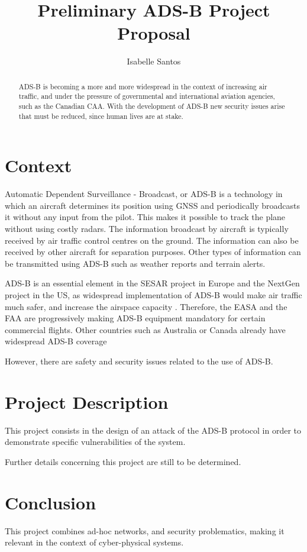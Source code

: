 \documentclass[10pt,letterpaper]{article}
\author{Isabelle Santos}
\title{Preliminary ADS-B Project Proposal}
\begin{document}
\maketitle
\begin{abstract}
ADS-B is becoming a more and more widespread in the context of increasing air traffic, and under the pressure of governmental and international aviation agencies, such as the Canadian CAA. With the development of ADS-B new security issues arise that must be reduced, since human lives are at stake. 
\end{abstract}

\section{Context}
Automatic Dependent Surveillance - Broadcast, or ADS-B is a technology in which an aircraft determines its position using GNSS and periodically broadcasts it without any input from the pilot. This makes it possible to track the plane without using costly radars. \cite{faaAdsbArchitecture, radarReplacement, faaStandardOrder}
The information broadcast by aircraft is typically received by air traffic control centres on the ground. The information can also be received by other aircraft for separation purposes. Other types of information can be transmitted using ADS-B such as weather reports and terrain alerts. \cite{faaAdsbServices, Kunzi09, trigAvionicsSupport}

ADS-B is an essential element in the SESAR project in Europe and the NextGen project in the US, as widespread implementation of ADS-B would make air traffic much safer, and increase the airspace capacity \cite{efficiencyGains}. Therefore, the EASA and the FAA are progressively making ADS-B equipment mandatory for certain commercial flights. Other countries such as Australia or Canada already have widespread ADS-B coverage \cite{australiaCoverage}

However, there are safety \cite{aopaseminar} and security \cite{adsbSpoofing, adsbSpoofingVid, faaHackersDisagree, Costin} issues related to the use of ADS-B. 

\section{Project Description}
This project consists in the design of an attack of the ADS-B protocol in order to demonstrate specific vulnerabilities of the system. 

Further details concerning this project are still to be determined. 


\section*{Conclusion}
This project combines ad-hoc networks, and security problematics, making it relevant in the context of cyber-physical systems. 



\end{document}
